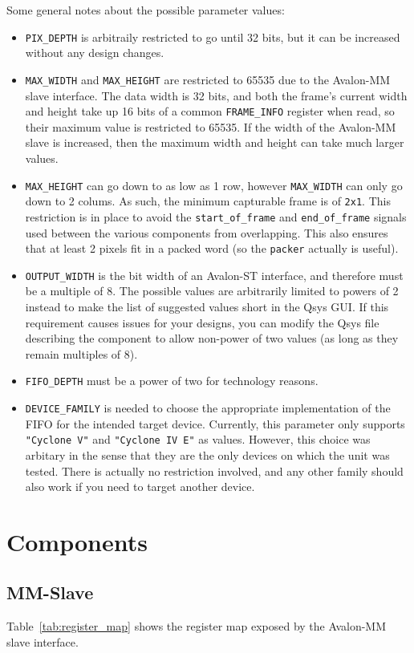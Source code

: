 \documentclass{article}
\begin{document}
Some general notes about the possible parameter values:
\begin{itemize}
    \item \texttt{PIX\_DEPTH} is arbitraily restricted to go until 32 bits, but it can be increased without any design changes.
    \item \texttt{MAX\_WIDTH} and \texttt{MAX\_HEIGHT} are restricted to 65535 due to the Avalon-MM slave interface. The data width is 32 bits, and both the frame's current width and height take up 16 bits of a common \texttt{FRAME\_INFO} register when read, so their maximum value is restricted to 65535. If the width of the Avalon-MM slave is increased, then the maximum width and height can take much larger values.
    \item \texttt{MAX\_HEIGHT} can go down to as low as 1 row, however \texttt{MAX\_WIDTH} can only go down to 2 colums. As such, the minimum capturable frame is of \texttt{2x1}. This restriction is in place to avoid the \texttt{start\_of\_frame} and \texttt{end\_of\_frame} signals used between the various components from overlapping. This also ensures that at least 2 pixels fit in a packed word (so the \texttt{packer} actually is useful).
    \item \texttt{OUTPUT\_WIDTH} is the bit width of an Avalon-ST interface, and therefore must be a multiple of 8. The possible values are arbitrarily limited to powers of 2 instead to make the list of suggested values short in the Qsys GUI. If this requirement causes issues for your designs, you can modify the Qsys file describing the component to allow non-power of two values (as long as they remain multiples of 8).
    \item \texttt{FIFO\_DEPTH} must be a power of two for technology reasons.
    \item \texttt{DEVICE\_FAMILY} is needed to choose the appropriate implementation of the FIFO for the intended target device. Currently, this parameter only supports \texttt{"Cyclone V"} and \texttt{"Cyclone IV E"} as values. However, this choice was arbitary in the sense that they are the only devices on which the unit was tested. There is actually no restriction involved, and any other family should also work if you need to target another device.
\end{itemize}

\section{Components}
\subsection{MM-Slave}
Table~\ref{tab:register_map} shows the register map exposed by the Avalon-MM slave interface.
\end{document}
